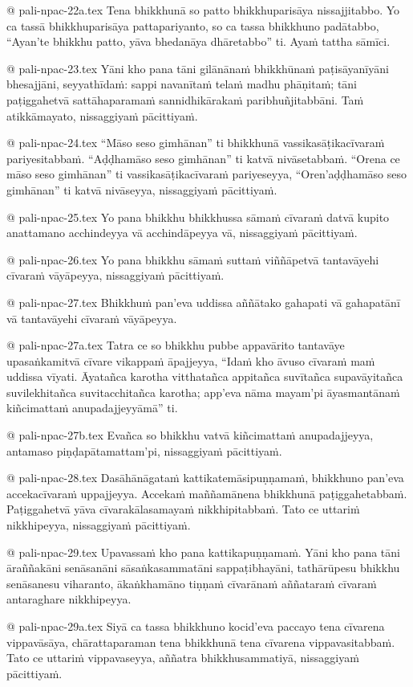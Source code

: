 @ pali-npac-22a.tex
Tena bhikkhunā so patto bhikkhuparisāya nissajjitabbo. Yo ca tassā bhikkhuparisāya pattapariyanto, so ca tassa bhikkhuno padātabbo, “Ayan’te bhikkhu patto, yāva bhedanāya dhāretabbo” ti. Ayaṁ tattha sāmīci.

@ pali-npac-23.tex
Yāni kho pana tāni gilānānaṁ bhikkhūnaṁ paṭisāyanīyāni bhesajjāni, seyyathīdaṁ: sappi navanītaṁ telaṁ madhu phāṇitaṁ; tāni paṭiggahetvā sattāhaparamaṁ sannidhikārakaṁ paribhuñjitabbāni. Taṁ atikkāmayato, nissaggiyaṁ pācittiyaṁ.

@ pali-npac-24.tex
“Māso seso gimhānan” ti bhikkhunā vassikasāṭikacīvaraṁ pariyesitabbaṁ. “Aḍḍhamāso seso gimhānan” ti katvā nivāsetabbaṁ. “Orena ce māso seso gimhānan” ti vassikasāṭikacīvaraṁ pariyeseyya, “Oren’aḍḍhamāso seso gimhānan” ti katvā nivāseyya, nissaggiyaṁ pācittiyaṁ.

@ pali-npac-25.tex
Yo pana bhikkhu bhikkhussa sāmaṁ cīvaraṁ datvā kupito anattamano acchindeyya vā acchindāpeyya vā, nissaggiyaṁ pācittiyaṁ.

@ pali-npac-26.tex
Yo pana bhikkhu sāmaṁ suttaṁ viññāpetvā tantavāyehi cīvaraṁ vāyāpeyya, nissaggiyaṁ pācittiyaṁ.

@ pali-npac-27.tex
Bhikkhuṁ pan’eva uddissa aññātako gahapati vā gahapatānī vā tantavāyehi cīvaraṁ vāyāpeyya.

@ pali-npac-27a.tex
Tatra ce so bhikkhu pubbe appavārito tantavāye upasaṅkamitvā cīvare vikappaṁ āpajjeyya, “Idaṁ kho āvuso cīvaraṁ maṁ uddissa vīyati. Āyatañca karotha vitthatañca appitañca suvītañca supavāyitañca suvilekhitañca suvitacchitañca karotha; app’eva nāma mayam’pi āyasmantānaṁ kiñcimattaṁ anupadajjeyyāmā” ti.

@ pali-npac-27b.tex
Evañca so bhikkhu vatvā kiñcimattaṁ anupadajjeyya, antamaso piṇḍapātamattam’pi, nissaggiyaṁ pācittiyaṁ.

@ pali-npac-28.tex
Dasāhānāgataṁ kattikatemāsipuṇṇamaṁ, bhikkhuno pan’eva accekacīvaraṁ uppajjeyya. Accekaṁ maññamānena bhikkhunā paṭiggahetabbaṁ. Paṭiggahetvā yāva cīvarakālasamayaṁ nikkhipitabbaṁ. Tato ce uttariṁ nikkhipeyya, nissaggiyaṁ pācittiyaṁ.

@ pali-npac-29.tex
Upavassaṁ kho pana kattikapuṇṇamaṁ. Yāni kho pana tāni āraññakāni senāsanāni sāsaṅkasammatāni sappaṭibhayāni, tathārūpesu bhikkhu senāsanesu viharanto, ākaṅkhamāno tiṇṇaṁ cīvarānaṁ aññataraṁ cīvaraṁ antaraghare nikkhipeyya.

@ pali-npac-29a.tex
Siyā ca tassa bhikkhuno kocid’eva paccayo tena cīvarena vippavāsāya, chārattaparaman tena bhikkhunā tena cīvarena vippavasitabbaṁ. Tato ce uttariṁ vippavaseyya, aññatra bhikkhusammatiyā, nissaggiyaṁ pācittiyaṁ.

